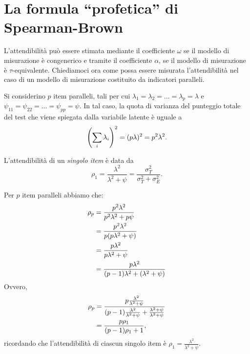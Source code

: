 %

\section{La formula ``profetica'' di Spearman-Brown}

L'attendibilità può essere stimata mediante il coefficiente $\omega$ se il modello di misurazione è congenerico e tramite il coefficiente $\alpha$, se il modello di misurazione è $\tau$-equivalente. 
Chiediamoci ora come possa essere misurata l'attendibilità nel caso di
un modello di misurazione costituito da indicatori paralleli.

Si considerino $p$ item paralleli, tali per cui 
$\lambda_1=\lambda_2=\dots=\lambda_p=\lambda$ e 
$\psi_{11}=\psi_{22}=\dots=\psi_{pp}=\psi$.
In tal caso, la quota di varianza del punteggio totale del test che viene spiegata dalla variabile latente  è uguale a
\begin{equation}
  \left(\sum_i \lambda_i \right)^2 = (p \lambda)^2 = p^2 \lambda^2.\notag
\end{equation}

L'attendibilità di un \textit{singolo item} è data da
 \begin{equation}
   \rho_1 = \frac{\lambda^2}{\lambda^2 + \psi} = \frac{\sigma_T^2}{\sigma_T^2+ \sigma_E^2}.
 \end{equation}

Per $p$ item paralleli abbiamo che:
\begin{align}
  \rho_p &= \frac{p^2 \lambda^2}{p^2 \lambda^2 + p \psi} \notag\\
  &= \frac{p^2 \lambda^2}{ p (p \lambda^2 + \psi)} \notag\\
  &= \frac{p \lambda^2}{ p \lambda^2 + \psi} \notag\\
  &= \frac{p \lambda^2}{(p-1) \lambda^2 + (\lambda^2 + \psi)} \notag%
\end{align}
Ovvero,
\begin{align}
  \rho_p 
  &= \frac{p \frac{\lambda^2}{\lambda^2+\psi}}{(p-1) \frac{\lambda^2}{\lambda^2+\psi} + \frac{\lambda^2 + \psi}{\lambda^2+\psi}} \notag\\
  &= \frac{p \rho_1}{(p-1)\rho_1 + 1},
  \label{eq:spearman_brown_der}
\end{align}
ricordando che l'attendibilità di ciascun singolo item è
$\rho_1 = \frac{\lambda^2}{\lambda^2 + \psi}$.

